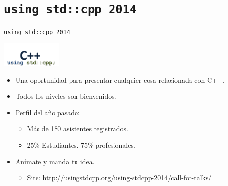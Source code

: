 \section{\texttt{using std::cpp 2014}}

\begin{frame}[t]{\texttt{using std::cpp 2014}}
\begin{center}
\includegraphics[width=3cm]{logos/usingstdcpp.png}
\end{center}
\begin{itemize}
  \item Una oportunidad para presentar cualquier cosa relacionada con C++.
  \item Todos los niveles son bienvenidos.
  \item Perfil del año pasado:
    \begin{itemize}
      \item Más de 180 asistentes registrados.
      \item 25\% Estudiantes. 75\% profesionales.
    \end{itemize}
  \item Anímate y manda tu idea.
    \begin{itemize}
      \item Site: \url{http://usingstdcpp.org/using-stdcpp-2014/call-for-talks/}
    \end{itemize}
\end{itemize}
\end{frame}
